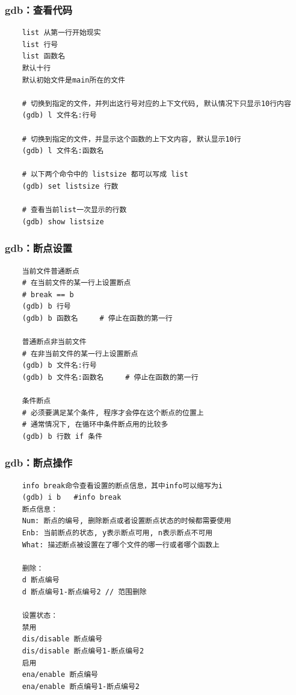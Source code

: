 \documentclass[UTF8]{ctexart}
\begin{document}
\subsubsection{gdb：查看代码}
\begin{verbatim}
	list 从第一行开始现实
	list 行号
	list 函数名
	默认十行
	默认初始文件是main所在的文件
	
	# 切换到指定的文件，并列出这行号对应的上下文代码, 默认情况下只显示10行内容
	(gdb) l 文件名:行号

	# 切换到指定的文件，并显示这个函数的上下文内容, 默认显示10行
	(gdb) l 文件名:函数名

	# 以下两个命令中的 listsize 都可以写成 list
	(gdb) set listsize 行数

	# 查看当前list一次显示的行数
	(gdb) show listsize
\end{verbatim}

\subsubsection{gdb：断点设置}
\begin{verbatim}
	当前文件普通断点
	# 在当前文件的某一行上设置断点
	# break == b
	(gdb) b 行号
	(gdb) b 函数名		# 停止在函数的第一行

	普通断点非当前文件
	# 在非当前文件的某一行上设置断点
	(gdb) b 文件名:行号
	(gdb) b 文件名:函数名		# 停止在函数的第一行

	条件断点
	# 必须要满足某个条件, 程序才会停在这个断点的位置上
	# 通常情况下, 在循环中条件断点用的比较多
	(gdb) b 行数 if 条件
\end{verbatim}



\subsubsection{gdb：断点操作}
\begin{verbatim}
	info break命令查看设置的断点信息，其中info可以缩写为i
	(gdb) i b   #info break
	断点信息：
	Num: 断点的编号, 删除断点或者设置断点状态的时候都需要使用
	Enb: 当前断点的状态, y表示断点可用, n表示断点不可用
	What: 描述断点被设置在了哪个文件的哪一行或者哪个函数上

	删除：
	d 断点编号
	d 断点编号1-断点编号2 // 范围删除

	设置状态：
	禁用
	dis/disable 断点编号
	dis/disable 断点编号1-断点编号2
	启用
	ena/enable 断点编号
	ena/enable 断点编号1-断点编号2
\end{verbatim}
\end{document}
